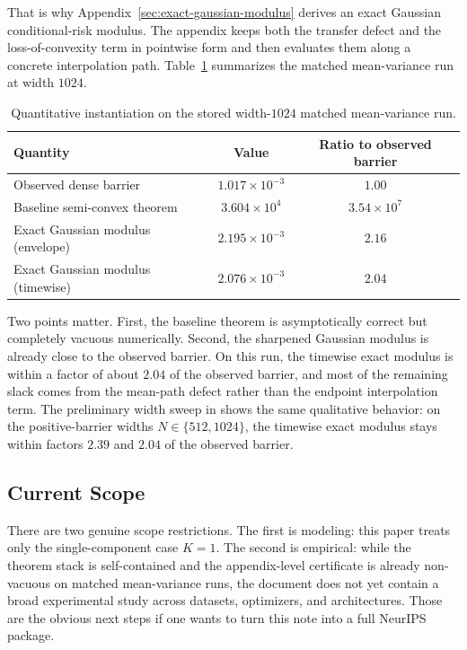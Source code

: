 \documentclass[11pt]{article}
\theoremstyle{definition}
\begin{document}
That is why Appendix~\ref{sec:exact-gaussian-modulus} derives an exact Gaussian
conditional-risk modulus. The appendix keeps both the transfer defect and the
loss-of-convexity term in pointwise form and then evaluates them along a
concrete interpolation path. Table~\ref{tab:gaussian-quantitative} summarizes the
matched mean-variance run at width $1024$.

\begin{table}[t]
  \centering
  \begin{tabular}{lcc}
    \toprule
    Quantity & Value & Ratio to observed barrier \\
    \midrule
    Observed dense barrier & $1.017\times 10^{-3}$ & $1.00$ \\
    Baseline semi-convex theorem & $3.604\times 10^{4}$ & $3.54\times 10^{7}$ \\
    Exact Gaussian modulus (envelope) & $2.195\times 10^{-3}$ & $2.16$ \\
    Exact Gaussian modulus (timewise) & $2.076\times 10^{-3}$ & $2.04$ \\
    \bottomrule
  \end{tabular}
  \caption{Quantitative instantiation on the stored width-$1024$
  matched mean-variance run.}
  \label{tab:gaussian-quantitative}
\end{table}

Two points matter. First, the baseline theorem is asymptotically correct but
completely vacuous numerically. Second, the sharpened Gaussian modulus is
already close to the observed barrier. On this run, the timewise exact modulus is
within a factor of about $2.04$ of the observed barrier, and most of the
remaining slack comes from the mean-path defect rather than the endpoint
interpolation term. The preliminary width sweep in
shows the same qualitative behavior: on the positive-barrier widths
$N\in\{512,1024\}$, the timewise exact modulus stays within factors $2.39$ and
$2.04$ of the observed barrier.

\subsection{Current Scope}

There are two genuine scope restrictions. The first is modeling: this paper
treats only the single-component case $K=1$. The second is empirical: while
the theorem stack is self-contained and the appendix-level certificate is
already non-vacuous on matched mean-variance runs, the document does not yet
contain a broad experimental study across datasets, optimizers, and
architectures. Those are the obvious next steps if one wants to turn this note
into a full NeurIPS package.
\end{document}
